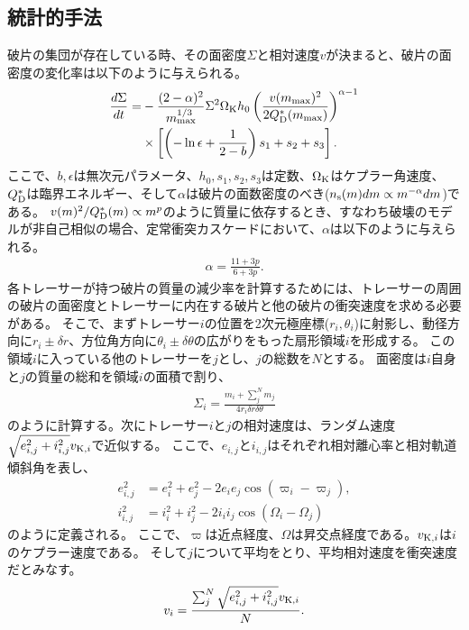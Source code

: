\documentclass[a4paper,10pt,oneside,twocolumn,notitlepage,final]{jarticle}
\begin{document}
\subsection{統計的手法}
破片の集団が存在している時、その面密度$\Sigma$と相対速度$v$が決まると、破片の面密度の変化率は以下のように与えられる\citep{Kobayashi2010}。
\begin{align}
 \frac{d \Sigma}{d t} =& - \frac{(2 - \alpha)^2}{m_{\rm max}^{1/3}} \Sigma^2 \Omega_{\rm K} h_0 \left( \frac{v(m_{\rm max})^2}{2 Q_{\rm D}^{\ast}(m_{\rm max})} \right)^{\alpha - 1} \nonumber \\
 &\times \left[ \left( - \ln \epsilon + \frac{1}{2 - b} \right) s_1 + s_2 + s_3 \right]. \label{eq:tau}
\end{align}
ここで、$b,\epsilon$は無次元パラメータ、$h_0,s_1,s_2,s_3$は定数、$\Omega_{\rm K}$はケプラー角速度、$Q_{\rm D}^{\ast}$は臨界エネルギー、そして$\alpha$は破片の面数密度のべき($n_{\rm s} (m) dm \propto m^{- \alpha} dm$)である。
$v(m)^2/Q_{\rm D}^{\ast}(m) \propto m^p$のように質量に依存するとき、すなわち破壊のモデルが非自己相似の場合、定常衝突カスケードにおいて、$\alpha$は以下のように与えられる\citep{Kobayashi2010}。
\begin{align}
 \alpha = \frac{11 + 3p}{6 + 3p}.
\end{align}
各トレーサーが持つ破片の質量の減少率を計算するためには、トレーサーの周囲の破片の面密度とトレーサーに内在する破片と他の破片の衝突速度を求める必要がある。
そこで、まずトレーサー$i$の位置を2次元極座標($r_i,\theta_i$)に射影し、動径方向に$r_i \pm \delta r$、方位角方向に$\theta_i \pm \delta \theta$の広がりをもった扇形領域$i$を形成する。
この領域$i$に入っている他のトレーサーを$j$とし、$j$の総数を$N$とする。
面密度は$i$自身と$j$の質量の総和を領域$i$の面積で割り、
\begin{align}
 \Sigma_i = \frac{m_i + \sum_{j}^{N} m_j}{4 r_i \delta r \delta \theta}
\end{align}
のように計算する。次にトレーサー$i$と$j$の相対速度は、ランダム速度$\sqrt{e_{i,j}^2 + i_{i,j}^2} v_{{\rm K},i}$で近似する。
ここで、$e_{i,j}$と$i_{i,j}$はそれぞれ相対離心率と相対軌道傾斜角を表し、
\begin{align}
 e_{i,j}^2 &= e_i^2 + e_j^2 - 2 e_i e_j \cos(\varpi_i - \varpi_j),\\
 i_{i,j}^2 &= i_i^2 + i_j^2 - 2 i_i i_j \cos(\Omega_i - \Omega_j)
\end{align}
のように定義される。
ここで、$\varpi$は近点経度、$\Omega$は昇交点経度である。$v_{{\rm K},i}$は$i$のケプラー速度である。
そして$j$について平均をとり、平均相対速度を衝突速度だとみなす。
\begin{align}
 v_i = \frac{\sum_{j}^{N} \sqrt{e_{i,j}^2+i_{i,j}^2} v_{{\rm K},i}}{N}.
\end{align}
\end{document}
